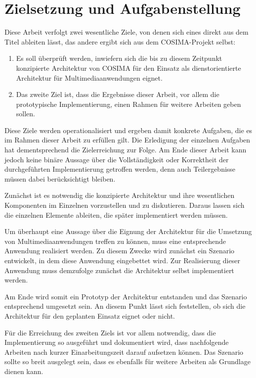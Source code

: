 
\section{Zielsetzung und Aufgabenstellung} %
\label{sec:zielsetzung_und_aufgabenstellung}

  Diese Arbeit verfolgt zwei wesentliche Ziele, von denen sich eines direkt aus dem Titel ableiten lässt, das andere ergibt sich aus dem COSIMA-Projekt selbst:

  \begin{enumerate}
    \item Es soll überprüft werden, inwiefern sich die bis zu diesem Zeitpunkt konzipierte Architektur von COSIMA für den Einsatz als dienstorientierte Architektur für Multimediaanwendungen eignet. 
    \item Das zweite Ziel ist, dass die Ergebnisse dieser Arbeit, vor allem die prototypische Implementierung, einen Rahmen für weitere Arbeiten geben sollen.
  \end{enumerate}
  
  Diese Ziele werden operationalisiert und ergeben damit konkrete Aufgaben, die es im Rahmen dieser Arbeit zu erfüllen gilt. Die Erledigung der einzelnen Aufgaben hat dementsprechend die Zielerreichung zur Folge. Am Ende dieser Arbeit kann jedoch keine binäre Aussage über die Vollständigkeit oder Korrektheit der durchgeführten Implementierung getroffen werden, denn auch Teilergebnisse müssen dabei berücksichtigt bleiben.
  
  Zunächst ist es notwendig die konzipierte Architektur und ihre wesentlichen Komponenten im Einzelnen vorzustellen und zu diskutieren. Daraus lassen sich die einzelnen Elemente ableiten, die später implementiert werden müssen.
  
  Um überhaupt eine Aussage über die Eignung der Architektur für die Umsetzung von Multimediaanwendungen treffen zu können, muss eine entsprechende Anwendung realisiert werden. Zu diesem Zwecke wird zunächst ein Szenario entwickelt, in dem diese Anwendung eingebettet wird. Zur Realisierung dieser Anwendung muss demzufolge zunächst die Architektur selbst implementiert werden.
  
  Am Ende wird somit ein Prototyp der Architektur entstanden und das Szenario entsprechend umgesetzt sein. An diesem Punkt lässt sich feststellen, ob sich die Architektur für den geplanten Einsatz eignet oder nicht.
  
  Für die Erreichung des zweiten Ziels ist vor allem notwendig, dass die Implementierung so ausgeführt und dokumentiert wird, dass nachfolgende Arbeiten nach kurzer Einarbeitungszeit darauf aufsetzen können. Das Szenario sollte so breit ausgelegt sein, dass es ebenfalls für weitere Arbeiten als Grundlage dienen kann.
  
